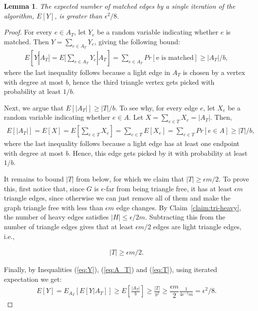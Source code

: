 \documentclass[11pt]{article}
\newtheorem{lemma}[theorem]{Lemma}
\begin{document}
\begin{lemma}
\label{lem:matched}
The expected number of matched edges by a single iteration of the algorithm, $E[Y]$, is greater than $\epsilon^2 /8$.
\end{lemma}
\begin{proof}
For every $e \in A_T$, let $Y_e$ be a random variable indicating whether $e$ is matched. Then $Y=\sum_{e \in A_T} Y_e$, giving the following bound:
\begin{align}
\label{eq:Y}
E[Y| A_T] = E[\sum_{e \in A_T} Y_e | A_T] = \sum_{e \in A_T} Pr[\text{e is matched}] \geq |A_T| / b,
\end{align}
where the last inequality follows because a light edge in $A_T$ is chosen by a vertex with degree at most $b$, hence the third triangle vertex gets picked with probability at least $1/b$.

Next, we argue that $E[|A_T|] \geq |T|/b$. To see why, for every edge $e$, let $X_e$ be a random variable indicating whether $e \in A$.
Let $X=\sum_{e \in T}X_e=|A_T|$. Then,
\begin{align}
\label{eq:A_T}
E[|A_T|] = E[X] = E[\sum_{e \in T} X_e] = \sum_{e \in T} E[X_e] = \sum_{e \in T} Pr[e \in A] \geq |T|/b,
\end{align}
where the last inequality follows because a light edge has at least one endpoint with degree at most $b$. Hence, this edge gets picked by it with probability at least $1/b$.

It remains to bound $|T|$ from below, for which we claim that  $|T| \geq \epsilon m / 2$. To prove this, first notice that, since $G$ is $\epsilon$-far from being triangle free, it has at least $\epsilon m$ triangle edges, since otherwise we can just remove all of them and make the graph triangle free with less than $\epsilon m$ edge changes.
By Claim~\ref{claim:tri-heavy}, the number of heavy edges satisfies $|H| \leq \epsilon/2 m$. Subtracting this from the number of triangle edges gives that at least $\epsilon m /2$ edges are light triangle edges, i.e.,

\begin{align}
\label{eq:T}
|T| \geq \epsilon m /2.
\end{align}

Finally, by Inequalities (\ref{eq:Y}),  (\ref{eq:A_T}) and (\ref{eq:T}), using iterated expectation we get:
\begin{align*}
E[Y]=E_{A_T}[E[Y|A_T]]\geq E[\frac{|A_T|}{b}]\geq \frac{|T|}{b^2} \geq \dfrac{\epsilon m}{2} \frac{1}{4\epsilon^{-1} m} = \epsilon^2/8.
\end{align*}
\end{proof}
	
\end{document}
